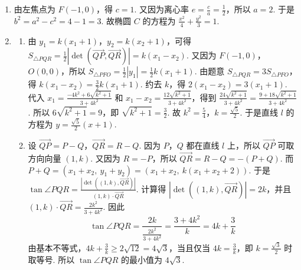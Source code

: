 \begin{solution}
\begin{enumerate}
\item 由左焦点为 \(F(-1,0)\)，得 \(c=1\). 又因为离心率 \(e=\frac{c}{a}=\frac{1}{2}\)，所以 \(a=2\). 于是 \(b^2=a^2-c^2=4-1=3\). 故椭圆 \(C\) 的方程为 \(\frac{x^2}{4}+\frac{y^2}{3}=1\).

\item
\begin{enumerate}
设直线 \(l\) 的方程为 \(y=k\left( x+1 \right)\)（\(k>0\)）. 设 \(P(x_1,y_1)\)，\(Q(x_2,y_2)\)，其中 \(x_1>x_2\). 将直线方程代入椭圆方程，得 \(\frac{x^2}{4}+\frac{k^2\left( x+1 \right)^2}{3}=1\). 化简为 \(\left( 3+4k^2 \right)x^2+8k^2x+4k^2-12=0\).
所以 \(x_1+x_2=-\frac{8k^2}{3+4k^2}\)，\(x_1-x_2=\frac{12\sqrt{k^2+1}}{3+4k^2}\).
因为 \(O\) 是椭圆中心，且直线 \(PO\) 经过原点，所以它与椭圆的另一个交点是 \(P\) 关于原点的对称点，即 \(R(-x_1,-y_1)\).

\item 由 \(y_1=k\left( x_1+1 \right)\)，\(y_2=k\left( x_2+1 \right)\)，可得 \(S_{\triangle PQR}=\frac{1}{2}\left| \det\left( \overrightarrow{QP},\overrightarrow{QR} \right) \right|=k\left( x_1-x_2 \right)\).
又因为 \(F(-1,0)\)，\(O(0,0)\)，所以 \(S_{\triangle PFO}=\frac{1}{2}\left| y_1 \right|=\frac{1}{2}k\left( x_1+1 \right)\).
由题意 \(S_{\triangle PQR}=3S_{\triangle PFO}\)，得 \(k\left( x_1-x_2 \right)=\frac{3}{2}k\left( x_1+1 \right)\). 约去 \(k\)，得 \(2\left( x_1-x_2 \right)=3\left( x_1+1 \right)\). 代入 \(x_1=\frac{-4k^2+6\sqrt{k^2+1}}{3+4k^2}\) 和 \(x_1-x_2=\frac{12\sqrt{k^2+1}}{3+4k^2}\)，得到 \(\frac{24\sqrt{k^2+1}}{3+4k^2}=\frac{9+18\sqrt{k^2+1}}{3+4k^2}\).
所以 \(6\sqrt{k^2+1}=9\)，即 \(\sqrt{k^2+1}=\frac{3}{2}\). 故 \(k^2=\frac{5}{4}\)，\(k=\frac{\sqrt{5}}{2}\). 于是直线 \(l\) 的方程为 \(y=\frac{\sqrt{5}}{2}\left( x+1 \right)\).

\item 设 \(\overrightarrow{QP}=P-Q\)，\(\overrightarrow{QR}=R-Q\). 因为 \(P\)，\(Q\) 都在直线 \(l\) 上，所以 \(\overrightarrow{QP}\) 可取方向向量 \(\left( 1,k \right)\). 又因为 \(R=-P\)，所以 \(\overrightarrow{QR}=R-Q=-(P+Q)\). 而 \(P+Q=\left( x_1+x_2,\ y_1+y_2 \right)=\left( x_1+x_2,\ k\left( x_1+x_2+2 \right) \right)\).
于是 \(\tan \angle PQR=\frac{\left| \det\left( \left( 1,k \right),\overrightarrow{QR} \right) \right|}{\left( 1,k \right)\cdot \overrightarrow{QR}}\).
计算得 \(\left| \det\left( \left( 1,k \right),\overrightarrow{QR} \right) \right|=2k\)，并且 \(\left( 1,k \right)\cdot \overrightarrow{QR}=\frac{2k^2}{3+4k^2}\).
因此
\[
\tan \angle PQR=\frac{2k}{\frac{2k^2}{3+4k^2}}=\frac{3+4k^2}{k}=4k+\frac{3}{k}
\]
由基本不等式，\(4k+\frac{3}{k}\ge 2\sqrt{12}=4\sqrt{3}\)，当且仅当 \(4k=\frac{3}{k}\)，即 \(k=\frac{\sqrt{3}}{2}\) 时取等号.
所以 \(\tan \angle PQR\) 的最小值为 \(4\sqrt{3}\).
\end{enumerate}
\end{enumerate}
\end{solution}

